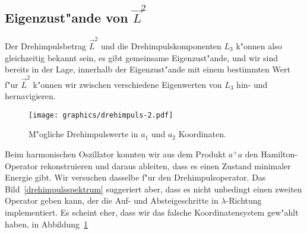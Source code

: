 \subsection{Eigenzust"ande von $\vec L^2$}
Der Drehimpulsbetrag $\vec L^2$ und die Drehimpulskomponenten $L_3$ 
k"onnen also gleichzeitig bekannt sein, es gibt gemeinsame Eigenzust"ande,
und wir sind bereits in der Lage, innerhalb der Eigenzust"ande mit einem
bestimmten Wert f"ur $\vec L^2$ k"onnen wir zwischen verschiedene
Eigenwerten von $L_3$ hin- und hernavigieren.

\begin{figure}
\centering
\texttt{[image: graphics/drehimpuls-2.pdf]}
\caption{M"ogliche Drehimpulswerte in $a_1$ und $a_2$ Koordinaten.
\label{drehimpulsspektruma}}
\end{figure}
Beim harmonischen Oszillator konnten wir aus dem Produkt $a^+a$
den Hamilton-Operator rekonstruieren und daraus ableiten, dass es einen
Zustand minimaler Energie gibt.
Wir versuchen dasselbe f"ur den Drehimpulsoperator.
Das Bild~\ref{drehimpulsspektrum} suggeriert aber, dass es nicht
unbedingt einen zweiten Operator geben kann, der die
Auf- und Absteigeschritte in $\lambda$-Richtung implementiert.
Es scheint eher, dass wir das falsche Koordinatensystem gew"ahlt
haben, in Abbildung~\ref{drehimpulsspektruma}

